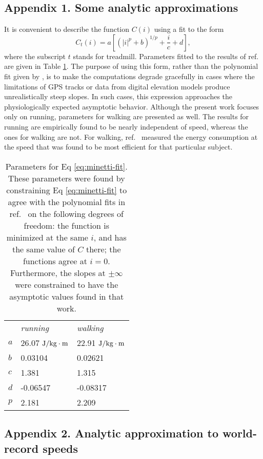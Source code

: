 \documentclass[10pt,letterpaper]{article}
\begin{document}
\subsection*{Appendix 1. Some analytic approximations}

It is convenient to describe the function $C(i)$ using a fit to the form
\begin{equation}\label{eq:minetti-fit}
  C_t(i) = a\left[(|i|^p+b)^{1/p}+\frac{i}{c}+d\right],
\end{equation}
where the subscript $t$ stands for treadmill.
Parameters fitted to the results of ref.~\cite{minetti} are given in Table \ref{table:minetti-params}.
The purpose of using this form, rather than the polynomial fit given by \cite{minetti}, is
to make the computations degrade gracefully in cases where the limitations of GPS tracks or data from digital elevation models
produce unrealistically steep slopes. In such cases, this expression approaches the physiologically
expected asymptotic behavior. Although the present work focuses only on running, parameters for walking
are presented as well. The results for running are empirically found to be nearly independent of speed,
whereas the ones for walking are not. For walking, ref.~\cite{minetti} measured the energy consumption
at the speed that was found to be most efficient for that
particular subject.

\begin{table}[h]
\caption{Parameters for Eq \eqref{eq:minetti-fit}. These parameters were found by constraining
Eq \ref{eq:minetti-fit} to agree with the polynomial fits in ref.~\cite{minetti} on the following
degrees of freedom: the function is minimized at the same $i$, and has the same value of $C$ there;
the functions agree at $i=0$. Furthermore, the slopes at $\pm\infty$ were constrained to have the asymptotic values
found in that work.}
\begin{tabular}{lll}
   & \emph{running} & \emph{walking} \\
$a$  & 26.07 $\textup{J}/\textup{kg}\cdot\textup{m}$ & 22.91 $\textup{J}/\textup{kg}\cdot\textup{m}$ \\
$b$  & 0.03104 & 0.02621 \\
$c$ & 1.381 & 1.315 \\
$d$ & -0.06547 & -0.08317 \\
$p$ & 2.181 & 2.209
\end{tabular}
\label{table:minetti-params}
\end{table}

\subsection*{Appendix 2. Analytic approximation to world-record speeds}
\end{document}
